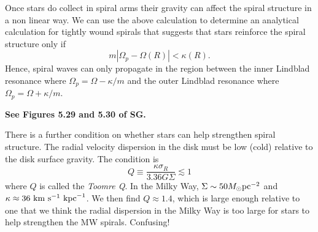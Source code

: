 \documentclass[]{article}
\begin{document}
Once stars do collect in spiral arms their gravity
can affect the spiral structure in a non linear way.  We can use the above calculation
to determine an analytical calculation for
tightly wound spirals that suggests that stars reinforce the spiral structure only if
\begin{equation}
m|\Omega_p - \Omega(R)| < \kappa(R).
\end{equation}
\noindent
Hence, spiral waves can only propagate in the region between the inner Lindblad resonance
where $\Omega_p = \Omega - \kappa/m$ and the outer Lindblad resonance where $\Omega_p = \Omega + \kappa/m$.

{\bf See Figures 5.29 and 5.30 of SG.}

There is a further condition on whether stars can help strengthen spiral structure.  The radial
velocity dispersion in the disk must be low (cold) relative to the disk surface gravity.  The condition
is
\begin{equation}
Q \equiv \frac{\kappa \sigma_R}{3.36 G \Sigma} \lesssim 1
\end{equation}
\noindent
where $Q$ is called the {\it Toomre Q}.  In the Milky Way, $\Sigma \sim 50 M_{\odot} \mathrm{pc}^{-2}$
and $\kappa \approx 36~\mathrm{km}~\mathrm{s}^{-1}~\mathrm{kpc}^{-1}$.  We then find $Q\approx 1.4$, which is
large enough relative to one that we think the radial dispersion in the Milky Way is 
too large for stars to help strengthen the MW spirals. Confusing!
\end{document}
